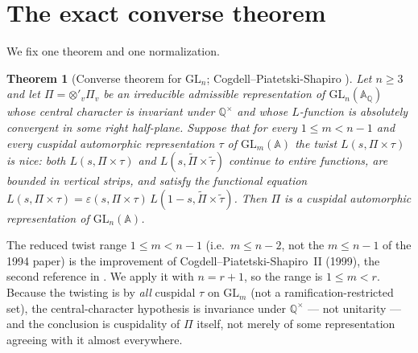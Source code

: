 \documentclass[11pt]{article}
\newtheorem{theorem}{Theorem}
\theoremstyle{definition}
\begin{document}
\section{The exact converse theorem}\label{sec:cps-thm}
We fix one theorem and one normalization.
\begin{theorem}[Converse theorem for $\mathrm{GL}_n$; Cogdell--Piatetski-Shapiro \cite{CPS}]\label{thm:cps}
Let $n\ge3$ and let $\Pi=\otimes'_v\Pi_v$ be an \emph{irreducible admissible} representation of
$\mathrm{GL}_n(\mathbb A_{\mathbb Q})$ whose central character is invariant under $\mathbb Q^\times$ and whose
$L$-function is absolutely convergent in some right half-plane. Suppose that for every $1\le m<n-1$ and every
cuspidal automorphic representation $\tau$ of $\mathrm{GL}_m(\mathbb A)$ the twist $L(s,\Pi\times\tau)$ is
\emph{nice}: both $L(s,\Pi\times\tau)$ and $L(s,\widetilde\Pi\times\widetilde\tau)$ continue to entire
functions, are bounded in vertical strips, and satisfy the functional equation
$L(s,\Pi\times\tau)=\varepsilon(s,\Pi\times\tau)\,L(1-s,\widetilde\Pi\times\widetilde\tau)$. Then $\Pi$ is a
\emph{cuspidal automorphic} representation of $\mathrm{GL}_n(\mathbb A)$.
\end{theorem}
\noindent The reduced twist range $1\le m<n-1$ (i.e.\ $m\le n-2$, not the $m\le n-1$ of the 1994 paper) is the
improvement of Cogdell--Piatetski-Shapiro~II (1999), the second reference in \cite{CPS}. We apply it with
$n=r+1$, so the range is $1\le m<r$. Because the twisting is by \emph{all} cuspidal $\tau$ on $\mathrm{GL}_m$
(not a ramification-restricted set), the central-character hypothesis is invariance under $\mathbb Q^\times$ ---
not unitarity --- and the conclusion is cuspidality of $\Pi$ itself, not merely of some representation agreeing
with it almost everywhere.
\end{document}
